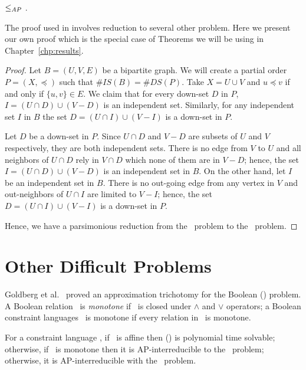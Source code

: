 \begin{lemma} \label{lem:bistods}
\cbis \(\le_{AP}\) \cds\@.
\end{lemma}

The proof used in \cite{counting} involves reduction to several other problem. Here 
we present our own proof which is the special case of Theorems we will be using in
Chapter~\ref{chp:results}\@.

\begin{proof}
Let \(B=(U,V,E)\) be a bipartite graph. We will create a partial order \(P=(X,\preceq)\)
such that \(\#IS(B)=\#DS(P)\)\@. Take \(X=U \cup V\) and \(u \preceq v\) if and only if
\(\{u,v\} \in E\)\@. We claim that for every down-set \(D\) in \(P\), 
\(I=(U\cap D) \cup (V - D)\) is an independent set. Similarly, for any independent set
\(I\) in \(B\) the set \(D=(U \cap I) \cup (V - I)\) is a down-set in \(P\)\@.

Let \(D\) be a down-set in \(P\)\@. Since \(U\cap D\) and \(V - D\) are subsets of
\(U\) and \(V\) respectively, they are both independent sets.
There is no edge from \(V\) to \(U\) and all neighbors of \(U\cap D\) rely in
\(V\cap D\) which none of them are in \(V - D\); hence, the set \(I=(U\cap D) \cup (V - D)\) is
an independent set in \(B\)\@. On the other hand, let \(I\) be an independent set in \(B\)\@.
There is no out-going edge from any vertex in \(V\) and
out-neighbors of \(U\cap I\) are limited to \(V - I\); hence, the set \(D=(U \cap I) \cup (V - I)\) is
a down-set in \(P\)\@.

Hence, we have a parsimonious reduction from the \cbis\ problem to the \cds\ problem.
\end{proof}

\section{Other Difficult Problems} \label{sec:other}
Goldberg et al.~\cite{Trichotomy} proved an approximation trichotomy for the Boolean
\ccsp(\mrelset) problem. A Boolean relation \mR\ is \emph{monotone} if \mR\ is closed under
\(\land\) and \(\lor\) operators; a Boolean constraint languages \mrelset\ is monotone if 
every relation in \mrelset\ is monotone.


\begin{theorem} \label{theorem:trichotomy}
For a constraint language \mrelset,
if \mrelset\ is affine then \ccsp(\mrelset) is polynomial time solvable; otherwise,
if \mrelset\ is monotone then it is AP-interreducible to the \cbis\ problem; otherwise,
it is AP-interreducible with the \csat\ problem.
\end{theorem}

